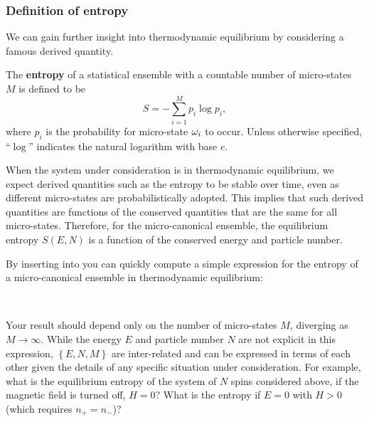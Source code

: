 \subsubsection{Definition of entropy}
We can gain further insight into thermodynamic equilibrium by considering a famous derived quantity.
\begin{shaded}
  The \textbf{entropy} of a statistical ensemble \Om with a countable number of micro-states $M$ is defined to be
  \begin{equation}
    \label{eq:entropy}
    S = - \sum_{i = 1}^M p_i \log p_i,
  \end{equation}
  where $p_i$ is the probability for micro-state $\omega_i$ to occur.
  Unless otherwise specified, ``$\log$'' indicates the natural logarithm with base $e$.
\end{shaded}

When the system under consideration is in thermodynamic equilibrium, we expect derived quantities such as the entropy to be stable over time, even as different micro-states are probabilistically adopted.
This implies that such derived quantities are functions of the conserved quantities that are the same for all micro-states.
Therefore, for the micro-canonical ensemble, the equilibrium entropy $S(E, N)$ is a function of the conserved energy and particle number.

By inserting  into  you can quickly compute a simple expression for the entropy of a micro-canonical ensemble in thermodynamic equilibrium:
\begin{mdframed}
  \ \\[40 pt]
\end{mdframed}
Your result should depend only on the number of micro-states $M$, diverging as $M \to \infty$.
While the energy $E$ and particle number $N$ are not explicit in this expression, $\left\{E, N, M\right\}$ are inter-related and can be expressed in terms of each other given the details of any specific situation under consideration.
For example, what is the equilibrium entropy of the system of $N$ spins considered above, if the magnetic field is turned off, $H = 0$?
What is the entropy if $E = 0$ with $H > 0$ (which requires $n_+ = n_-$)?
\begin{mdframed}
  \ \\[110 pt]
\end{mdframed}



